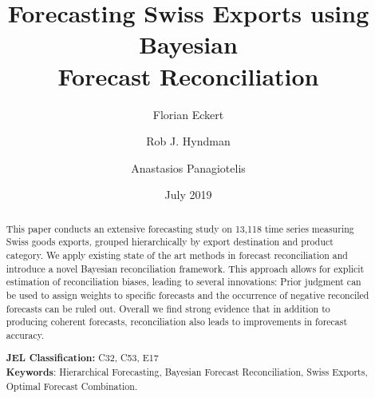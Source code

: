 


\title{\huge Forecasting Swiss Exports using Bayesian \\Forecast Reconciliation}

\author[$\dagger$]{Florian Eckert}
\author[$\ddagger$]{Rob J. Hyndman}
\author[$\ddagger$]{Anastasios Panagiotelis}
\date{July 2019}

\maketitle
\begin{abstract}
\noindent This paper conducts an extensive forecasting study on 13,118 time series measuring Swiss goods exports, grouped hierarchically by export destination and product category.  We apply existing state of the art methods in forecast reconciliation and introduce a novel Bayesian reconciliation framework. This approach allows for explicit estimation of reconciliation biases, leading to several innovations: Prior judgment can be used to assign weights to specific forecasts and the occurrence of negative reconciled forecasts can be ruled out. Overall we find strong evidence that in addition to producing coherent forecasts, reconciliation also leads to improvements in forecast accuracy.

\noindent \textbf{JEL Classification:} C32, C53, E17\\
\noindent \textbf{Keywords}: Hierarchical Forecasting, Bayesian Forecast Reconciliation, Swiss Exports, Optimal Forecast Combination.
\end{abstract}
\clearpage









